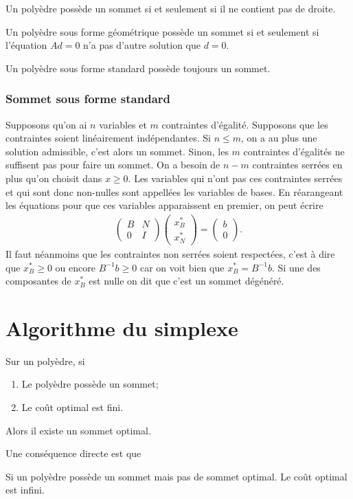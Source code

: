 \begin{myprop}
  Un polyèdre possède un sommet si et seulement si il ne contient
  pas de droite.
\end{myprop}

\begin{myprop}
  Un polyèdre sous forme géométrique possède un sommet si et seulement si
  l'équation $Ad = 0$ n'a pas d'autre solution que $d = 0$.
\end{myprop}

\begin{myprop}
  Un polyèdre sous forme standard possède toujours un sommet.
\end{myprop}

\subsubsection{Sommet sous forme standard}
Supposons qu'on ai $n$ variables et $m$ contraintes d'égalité.
Supposons que les contraintes soient linéairement indépendantes.
Si $n \leq m$, on a au plus une solution admissible, c'est alors un sommet.
Sinon, les $m$ contraintes d'égalités ne suffisent pas pour faire un sommet.
On a besoin de $n-m$ contraintes serrées
en plus qu'on choisit dans $x \geq 0$.
Les variables qui n'ont pas ces contraintes serrées et qui sont donc
non-nulles sont appellées les variables de bases.
En réarangeant les équations pour que ces variables apparaissent en premier,
on peut écrire
\begin{align*}
  \begin{pmatrix}
    B & N\\
    0 & I
  \end{pmatrix}
  \begin{pmatrix}
    x_B^*\\
    x_N^*
  \end{pmatrix} =
  \begin{pmatrix}
    b\\
    0
  \end{pmatrix}.
\end{align*}
Il faut néanmoins que les contraintes non serrées soient respectées,
c'est à dire que $x_B^* \geq 0$ ou encore $B^{-1}b \geq 0$ car
on voit bien que $x_B^* = B^{-1}b$.
Si une des composantes de $x_B^*$ est nulle on dit que c'est un
sommet dégénéré.

\section{Algorithme du simplexe}
\begin{mytheo}
  Sur un polyèdre, si
  \begin{enumerate}
    \item Le polyèdre possède un sommet;
    \item Le coût optimal est fini.
  \end{enumerate}
  Alors il existe un sommet optimal.
\end{mytheo}
Une conséquence directe est que
\begin{mycorr}
  Si un polyèdre possède un sommet mais pas de sommet optimal.
  Le coût optimal est infini.
\end{mycorr}


